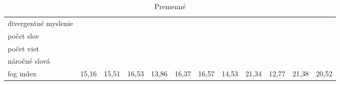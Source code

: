 \begin{table}[h]
\begin{adjustbox}{width=1\textwidth}
\begin{tabular}{|l|c|c|c|c|c|c|c|c|c|c|c|}
divergentné myslenie               &    &    &    &    &    &    &  & & & & \\ \Xhline{4\arrayrulewidth}
počet slov 						  &    &    &    &    &    &    &  & & & & \\ \hline
počet viet 						 &    &    &    &    &    &    &  & & & & \\ \hline
náročné slová 					&    &    &    &    &    &    &  & & & & \\ \hline
fog index                          &  15,16  & 15,51  & 16,53 & 13,86 & 16,37 & 16,57  & 14,53 & 21,34 & 12,77 & 21,38 & 20,52 \\ \hline
\end{tabular}
\end{adjustbox}
\caption{Premenné}
\end{table} 


